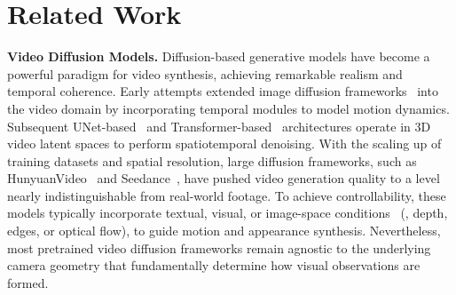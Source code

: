 \section{Related Work}
\label{sec:related}

\noindent\textbf{Video Diffusion Models.}
Diffusion-based generative models have become a powerful paradigm for video synthesis, achieving remarkable realism and temporal coherence.
Early attempts extended image diffusion frameworks~\cite{rombach2022high, guo2024animatediff} into the video domain by incorporating temporal modules to model motion dynamics.
Subsequent UNet-based~\cite{ho2022video, blattmann2023stable} and Transformer-based~\cite{yang2025cogvideox, wan2025wan} architectures operate in 3D video latent spaces to perform spatiotemporal denoising.
With the scaling up of training datasets and spatial resolution, large diffusion frameworks, such as HunyuanVideo~\cite{kong2024hunyuanvideo} and Seedance~\cite{gao2025seedance}, have pushed video generation quality to a level nearly indistinguishable from real-world footage.
To achieve controllability, these models typically incorporate textual, visual, or image-space conditions~\cite{wang2023videocomposer, guo2024sparsectrl, gu2025diffusion, burgert2025go} (\eg, depth, edges, or optical flow), to guide motion and appearance synthesis.
Nevertheless, most pretrained video diffusion frameworks remain agnostic to the underlying camera geometry that fundamentally determine how visual observations are formed.

